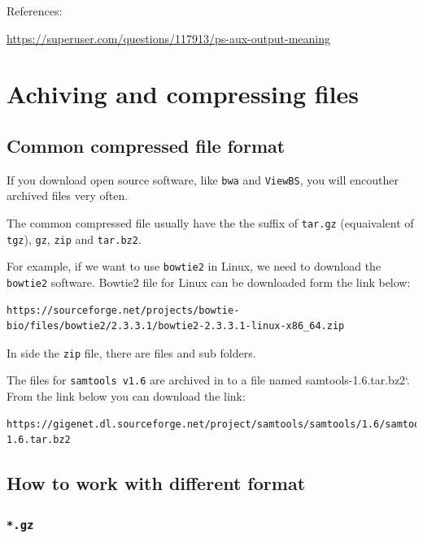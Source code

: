 \documentclass[]{book}
\begin{document}
References:

\url{https://superuser.com/questions/117913/ps-aux-output-meaning}

\hypertarget{achiving-and-compressing-files}{%
\chapter{Achiving and compressing files}\label{achiving-and-compressing-files}}

\hypertarget{common-compressed-file-format}{%
\section{Common compressed file format}\label{common-compressed-file-format}}

If you download open source software, like \texttt{bwa} and \texttt{ViewBS}, you will encouther archived files very often.

The common compressed file usually have the the suffix of \texttt{tar.gz} (equaivalent of \texttt{tgz}), \texttt{gz}, \texttt{zip} and \texttt{tar.bz2}.

For example, if we want to use \texttt{bowtie2} in Linux, we need to download the \texttt{bowtie2} software. Bowtie2 file for Linux can be downloaded form the link below:

\begin{verbatim}
https://sourceforge.net/projects/bowtie-bio/files/bowtie2/2.3.3.1/bowtie2-2.3.3.1-linux-x86_64.zip
\end{verbatim}

In side the \texttt{zip} file, there are files and sub folders.

The files for \texttt{samtools\ v1.6} are archived in to a file named samtools-1.6.tar.bz2`. From the link below you can download the link:

\begin{verbatim}
https://gigenet.dl.sourceforge.net/project/samtools/samtools/1.6/samtools-1.6.tar.bz2
\end{verbatim}

\hypertarget{how-to-work-with-different-format}{%
\section{How to work with different format}\label{how-to-work-with-different-format}}

\hypertarget{gz}{%
\subsection{\texorpdfstring{\texttt{*.gz}}{*.gz}}\label{gz}}
\end{document}
